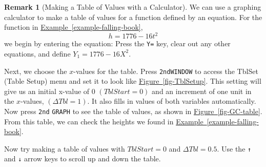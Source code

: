 \documentclass[10pt,]{book}
\theoremstyle{plain}
\theoremstyle{definition}
\newtheorem{remark}[theorem]{Remark}
\theoremstyle{definition}
\theoremstyle{definition}
\theoremstyle{definition}
\numberwithin{equation}{part}
\newlength{\panelmax}
\begin{document}
\begin{remark}[Making a Table of Values with a Calculator]\label{remark-3}
We can use a graphing calculator to make a table of values for a function defined by an equation. For the function in \hyperref[example-falling-book]{Example~\ref{example-falling-book}},%
\begin{equation*}
h = 1776 - 16t^2
\end{equation*}
we begin by entering the equation: Press the \lstinline?Y=? key, clear out any other equations, and define \(Y_1 = 1776 - 16X^2.\)%
\par
Next, we choose the \(x\)-values for the table. Press \lstinline?2nd?\lstinline?WINDOW? to access the TblSet (Table Setup) menu and set it to look like \hyperref[fig-TblSetup]{Figure~\ref{fig-TblSetup}}. This setting will give us an initial x-value of 0 \((TblStart = 0)\) and an increment of one unit in the \(x\)-values, \((\Delta Tbl = 1)\). It also fills in values of both variables automatically. Now press \lstinline?2nd? \lstinline?GRAPH? to see the table of values, as shown in \hyperref[fig-GC-table]{Figure~\ref{fig-GC-table}}. From this table, we can check the heights we found in \hyperref[example-falling-book]{Example~\ref{example-falling-book}}.%
\par
Now try making a table of values with \(TblStart = 0\) and \(\Delta Tbl = 0.5\). Use the   \lstinline?↑? and \lstinline?↓? arrow keys to scroll up and down the table.%
{%
\setlength{\panelmax}{0pt}
\newsavebox{\panelboxAXimage}
\newlength{\phAXimage}\setlength{\phAXimage}{\ht\panelboxAXimage+\dp\panelboxAXimage}
\settototalheight{\phAXimage}{\usebox{\panelboxAXimage}}
\setlength{\panelmax}{\maxof{\panelmax}{\phAXimage}}
\newsavebox{\panelboxAYimage}
}
\end{remark}
\end{document}
